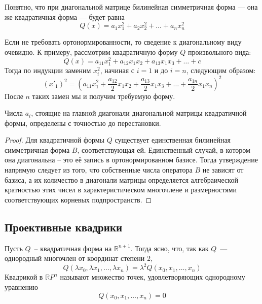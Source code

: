 \documentclass[11pt]{article}
\begin{document}
    \begin{remark}
    Понятно, что при диагональной матрице билинейная симметричная форма --- она же квадратичная форма --- будет равна
    \begin{equation*}
        Q(x) = a_1x_1^2 + a_2x_2^2 + \hdots + a_nx_n^2
    \end{equation*}
    \end{remark}

    \begin{remark}
    Если не требовать ортонормированности, то сведение к диагональному виду очевидно. К примеру, рассмотрим квадратичную форму $Q$ произвольного вида:
    \begin{equation*}
        Q(x) = a_{11}x_1^2 + a_{12}x_1x_2 + a_{13}x_1x_3 + \hdots + c
    \end{equation*}
    Тогда по индукции заменим $x_i^2$, начиная с $i = 1$ и до $i = n$, следующим образом:
    \begin{equation*}
        (x'_{1})^2 = (a_{11}x_1^2 + \dfrac{a_{12}}{2}x_1x_2 + \dfrac{a_{13}}{2}x_1x_3 + \hdots + \dfrac{a_{1n}}{2}x_1x_n)^2
    \end{equation*}
    После $n$ таких замен мы и получим требуемую форму.
    \end{remark}

    \begin{lemma}
    Числа $a_i$, стоящие на главной диагонали диагональной матрицы квадратичной формы, определены с точностью до перестановки.
    \end{lemma}

    \begin{proof}
    Для квадратичной формы $Q$ существует единственная билинейная симметричная форма $B$, соответствующая ей. Единственный случай, в котором она диагональна -- это её запись в ортонормированном базисе. Тогда утверждение напрямую следует из того, что собственные числа оператора $B$ не зависят от базиса, а их количество в диагонали матрицы определяется алгебраической кратностью этих чисел в характеристическом многочлене и размерностями соответствующих корневых подпространств.
    \end{proof}

    \subsection{Проективные квадрики}
    \begin{definition}
        Пусть $Q$~-- квадратичная форма на $\mathbb{R}^{n + 1}$. Тогда ясно, что, так как $Q$~--- однородный многочлен от координат степени 2,
        \[ Q(\lambda x_0, \lambda x_1, \ldots, \lambda x_n) = \lambda^2 Q(x_0, x_1, \ldots, x_n) \]
        Квадрикой в $\mathbb{R}P^n$ называют множество точек, удовлетворяющих однородному уравнению
        \[Q(x_0, x_1, \ldots, x_n) = 0 \]

    \end{definition}

    
\end{document}
